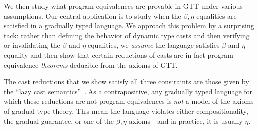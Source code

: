 \documentclass[acmsmall,screen,12pt]{acmart}
\begin{document}


We then study what program equivalences are provable in GTT under
various assumptions.
%
Our central application is to study when the $\beta, \eta$ equalities
are satisfied in a gradually typed language.
%
%
We approach this problem by a surprising tack: rather than defining the
behavior of dynamic type casts and then verifying or invalidating the
$\beta$ and $\eta$ equalities, we \emph{assume} the language satisfies
$\beta$ and $\eta$ equality and then show that certain reductions of
casts are in fact program equivalence \emph{theorems} deducible from the
axioms of GTT.

The cast reductions that we show satisfy all three constraints are
those given by the ``lazy cast semantics''~\cite{findler-felleisen02,siek+09designspace}.
%
As a contrapositive, any gradually typed language for which these
reductions are not program equivalences is \emph{not} a model of the
axioms of gradual type theory.
%
This mean the language violates either compositionality, the gradual
guarantee, or one of the $\beta, \eta$ axioms---and in practice, it is
usually $\eta$.
\end{document}
